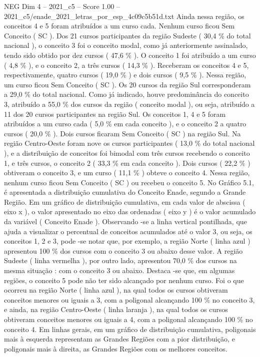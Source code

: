 \begin{textsample}{NEG Dim 4 – 2021\_c5 – Score 1.00 – 2021\_c5/enade\_2021\_letras\_por\_esp\_4c09c5b51d.txt}
Ainda nessa região, os conceitos 4 e 5 foram atribuídos a um curso cada.
Nenhum curso ficou Sem Conceito ( SC ).
Dos 21 cursos participantes da região Sudeste ( 30,4 \% do total nacional ), o conceito 3 foi o conceito modal, como já anteriormente assinalado, tendo sido obtido por dez cursos ( 47,6 \% ).
O conceito 1 foi atribuído a um curso ( 4,8 \% ), e o conceito 2, a três cursos ( 14,3 \% ).
Receberam os conceitos 4 e 5, respectivamente, quatro cursos ( 19,0 \% ) e dois cursos ( 9,5 \% ).
Nessa região, um curso ficou Sem Conceito ( SC ).
Os 20 cursos da região Sul corresponderam a 29,0 \% do total nacional.
Como já indicado, houve predominância do conceito 3, atribuído a 55,0 \% dos cursos da região ( conceito modal ), ou seja, atribuído a 11 dos 20 cursos participantes na região Sul.
Os conceitos 1, 4 e 5 foram atribuídos a um curso cada ( 5,0 \% em cada conceito ), e o conceito 2 a quatro cursos ( 20,0 \% ).
Dois cursos ficaram Sem Conceito ( SC ) na região Sul.
Na região Centro-Oeste foram nove os cursos participantes ( 13,0 \% do total nacional ), e a distribuição de conceitos foi bimodal com três cursos recebendo o conceito 1, e três cursos, o conceito 2 ( 33,3 \% em cada conceito ).
Dois cursos ( 22,2 \% ) obtiveram o conceito 3, e um curso ( 11,1 \% ) obteve o conceito 4.
Nessa região, nenhum curso ficou Sem Conceito ( SC ) ou recebeu o conceito 5.
No Gráfico 5.1, é apresentada a distribuição cumulativa do Conceito Enade, segundo a Grande Região.
Em um gráfico de distribuição cumulativa, em cada valor de abscissa ( eixo x ), o valor apresentado no eixo das ordenadas ( eixo y ) é o valor acumulado da variável ( Conceito Enade ).
Observando -se a linha vertical pontilhada, que ajuda a visualizar o percentual de conceitos acumulados até o valor 3, ou seja, os conceitos 1, 2 e 3, pode -se notar que, por exemplo, a região Norte ( linha azul ) apresentou 100 \% dos cursos com o conceito 3 ou abaixo desse valor.
A região Sudeste ( linha vermelha ), por outro lado, apresentou 70,0 \% dos cursos na mesma situação : com o conceito 3 ou abaixo.
Destaca -se que, em algumas regiões, o conceito 5 pode não ter sido alcançado por nenhum curso.
Foi o que ocorreu na região Norte ( linha azul ), na qual todos os cursos obtiveram conceitos menores ou iguais a 3, com a poligonal alcançando 100 \% no conceito 3, e ainda, na região Centro-Oeste ( linha laranja ), na qual todos os cursos obtiveram conceitos menores ou iguais a 4, com a poligonal alcançando 100 \% no conceito 4.
Em linhas gerais, em um gráfico de distribuição cumulativa, poligonais mais à esquerda representam as Grandes Regiões com a pior distribuição, e poligonais mais à direita, as Grandes Regiões com os melhores conceitos.

\end{textsample}
